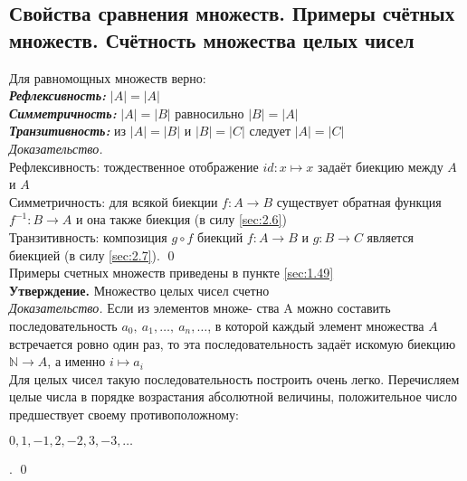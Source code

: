 \documentclass[a4paper]{article}
\begin{document}
\subsection{Свойства сравнения множеств. Примеры счётных множеств. Счётность множества целых чисел}
Для равномощных множеств верно:\\[2mm]
 \textbf{\textit{Рефлексивность:}} $|A|=|A|$\\[2mm]
 \textbf{\textit{Симметричность:}} $|A|=|B|$ равносильно $|B|=|A|$\\[2mm]
 \textbf{\textit{Транзитивность:}} из $|A|=|B|$ и $|B|=|C|$ следует $|A|=|C|$\\[2mm]
\textit{Доказательство.}\\[2mm]
 Рефлексивность: тождественное отображение $id: x\mapsto x$ задаёт биекцию между $A$ и $A$\\[2mm]
 Симметричность: для всякой биекции $f : A\rightarrow B$ существует обратная функция $f^{-1}: B\rightarrow A$ и она также биекция (в силу \ref{sec:2.6})\\[2mm]
 Транзитивность: композиция $g\circ f$ биекций $f: A \rightarrow B$ и $g: B \rightarrow C$ является биекцией (в силу \ref{sec:2.7}). \qed\\[2mm]
Примеры счетных множеств приведены в пункте \ref{sec:1.49}\\[2mm]
\textbf{Утверждение.}  Множество целых чисел счетно\\[2mm]
\textit{Доказательство.} Если из элементов множе- ства A можно составить последовательность $a_0,\ a_1,\ldots,\ a_n,\ldots$, в которой каждый элемент множества $A$ встречается ровно один раз, то эта последовательность задаёт искомую биекцию $\mathbb{N}\rightarrow A$, а именно $i\mapsto a_i$\\[2mm]
 Для целых чисел такую последовательность построить очень легко. Перечисляем целые числа в порядке возрастания абсолютной величины, положительное число предшествует своему противоположному:\\[2mm]
\centerline{$0, 1,-1, 2, -2, 3, -3,\ldots$}. \qed\\[5mm]
\end{document}
